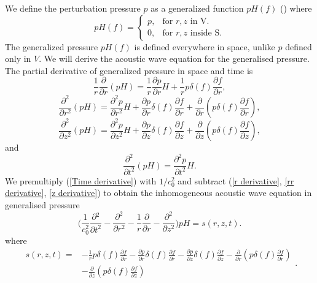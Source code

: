 \documentclass[a4paper]{article}
\begin{document}
We define the perturbation pressure $p$ as a generalized function $pH(f)$ (\cite{ffowcs1969sound}) where
\begin{equation}\label{Generalized_Functions}
	p H(f) =\begin{cases}
		p , & \text{for $r, z$ in V}.     \\
		0,  & \text{for $r, z$ inside S}.
	\end{cases}
\end{equation}
The generalized pressure $pH(f)$ is defined everywhere in space, unlike $p$ defined only in $V$. We will derive the acoustic wave equation for the generalised pressure. The partial derivative of generalized pressure in space and time is
\begin{equation}\label{r derivative}
	\frac{1}{r}\frac{\partial }{\partial r}(pH) = \frac{1}{r}\frac{\partial p}{\partial r}H + \frac{1}{r}p\delta(f)\frac{\partial f}{\partial r},
\end{equation}
\begin{equation}\label{rr derivative}
	\frac{\partial^2}{\partial r^2}(pH) = \frac{\partial^2 p}{\partial r^2}H + \frac{\partial p}{\partial r}\delta(f)\frac{\partial f}{\partial r} + \frac{\partial}{\partial r}(p\delta(f)\frac{\partial f}{\partial r}),
\end{equation}
\begin{equation}\label{z derivative}
	\frac{\partial^2}{\partial z^2}(pH) = \frac{\partial^2 p}{\partial z^2}H + \frac{\partial p}{\partial z}\delta(f)\frac{\partial f}{\partial z} + \frac{\partial}{\partial z}(p\delta(f)\frac{\partial f}{\partial z}),
\end{equation}
and
\begin{equation}\label{Time derivative}
	\frac{\partial^2}{\partial t^2}(pH) = \frac{\partial^2 p }{\partial t^2}H.
\end{equation}
We premultiply (\ref{Time derivative}) with $1/{c_{0}^2}$ and subtract (\ref{r derivative}, \ref{rr derivative}, \ref{z derivative}) to obtain the inhomogeneous acoustic wave equation in generalised pressure
\begin{equation}\label{Generalized wave equation}
	\Bigg( \frac{1}{c_{0}^2}\frac{\partial{}^{2}}{\partial{t}^{2}}- \frac{\partial^2}{\partial r^2} - \frac{1}{r}\frac{\partial}{\partial r} - \frac{\partial^2}{\partial z^2}\Bigg) pH = s(r, z, t).
\end{equation}
where
\begin{equation}\label{Source}
	\begin{split}
		s(r, z, t) =& -\frac{1}{r}p\delta(f)\frac{\partial f}{\partial r}
	-\frac{\partial p}{\partial r}\delta(f)\frac{\partial f}{\partial r}
	-\frac{\partial p}{\partial z}\delta(f)\frac{\partial f}{\partial z}
	-\frac{\partial}{\partial r}(p\delta(f)\frac{\partial f}{\partial r})\\
	&-\frac{\partial}{\partial z}(p\delta(f)\frac{\partial f}{\partial z})
	\end{split}.
\end{equation}
\end{document}
